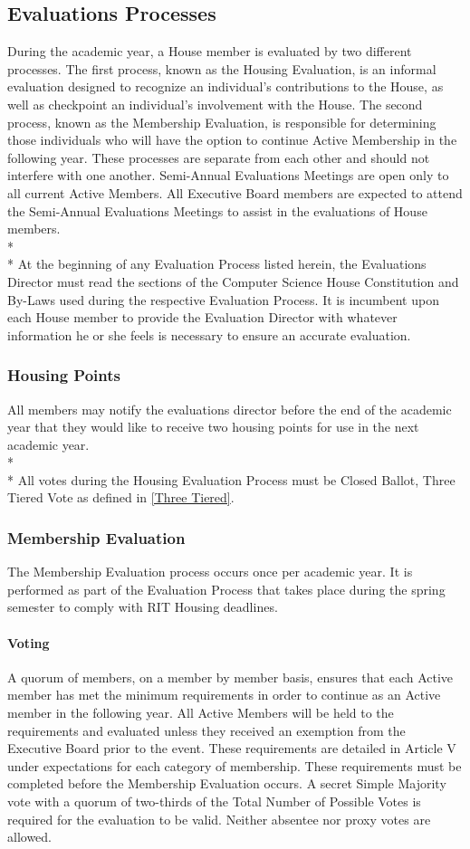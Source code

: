 \documentclass{article}
\newcommand{\bsection}[1]{\subsection{#1} \label{#1}}
\newcommand{\bsubsection}[1]{\subsubsection{#1} \label{#1}}
\newcommand{\bsubsubsection}[1]{\paragraph{#1} \label{#1}}
\begin{document}
\bsection{Evaluations Processes}
During the academic year, a House member is evaluated by two different processes.
The first process, known as the Housing Evaluation, is an informal evaluation designed to recognize an individual's contributions to the House, as well as checkpoint an individual's involvement with the House.
The second process, known as the Membership Evaluation, is responsible for determining those individuals who will have the option to continue Active Membership in the following year.
These processes are separate from each other and should not interfere with one another.
Semi-Annual Evaluations Meetings are open only to all current Active Members.
All Executive Board members are expected to attend the Semi-Annual Evaluations Meetings to assist in the evaluations of House members.
\\* \\*
At the beginning of any Evaluation Process listed herein, the Evaluations Director must read the sections of the Computer Science House Constitution and By-Laws used during the respective Evaluation Process.
It is incumbent upon each House member to provide the Evaluation Director with whatever information he or she feels is necessary to ensure an accurate evaluation.
\bsubsection{Housing Points}
All members may notify the evaluations director before the end of the academic year that they would like to receive two housing points for use in the next academic year.
\\* \\*
All votes during the Housing Evaluation Process must be Closed Ballot, Three Tiered Vote as defined in \ref{Three Tiered}.
\bsubsection{Membership Evaluation}
The Membership Evaluation process occurs once per academic year. It is performed as part of the Evaluation Process that takes place during the spring semester to comply with RIT Housing deadlines.
\bsubsubsection{Voting} 
A quorum of members, on a member by member basis, ensures that each Active member has met the minimum requirements in order to continue as an Active member in the following year.
All Active Members will be held to the requirements and evaluated unless they received an exemption from the Executive Board prior to the event.
These requirements are detailed in Article V under expectations for each category of membership.
These requirements must be completed before the Membership Evaluation occurs.
A secret Simple Majority vote with a quorum of two-thirds of the Total Number of Possible Votes is required for the evaluation to be valid.
Neither absentee nor proxy votes are allowed.
\end{document}
